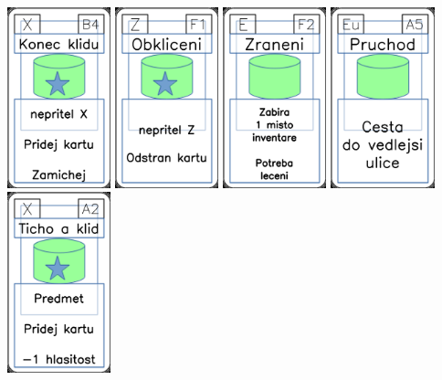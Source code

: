 \documentclass[a4paper]{article}
\begin{document}
	\includegraphics[width=3.0cm]{img-5_8}
	\includegraphics[width=3.0cm]{img-5_55}
	\includegraphics[width=3.0cm]{img-4_56}
	\includegraphics[width=3.0cm]{img-4_34}
	\includegraphics[width=3.0cm]{img-5_1}
\end{document}
